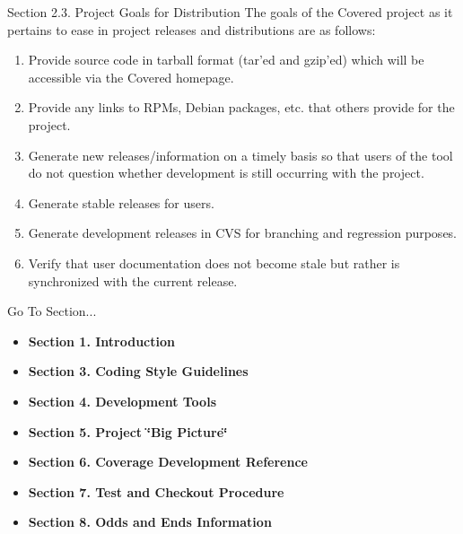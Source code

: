 \begin{Desc}
\item[Section 2.3. Project Goals for Distribution]The goals of the Covered project as it pertains to ease in project releases and distributions are as follows:\end{Desc}
\begin{Desc}
\item[]\begin{enumerate}
\item Provide source code in tarball format (tar'ed and gzip'ed) which will be accessible via the Covered homepage.\item Provide any links to RPMs, Debian packages, etc. that others provide for the project.\item Generate new releases/information on a timely basis so that users of the tool do not question whether development is still occurring with the project.\item Generate stable releases for users.\item Generate development releases in CVS for branching and regression purposes.\item Verify that user documentation does not become stale but rather is synchronized with the current release.\end{enumerate}
\end{Desc}




\begin{Desc}
\item[Go To Section...]\begin{itemize}
\item {\bf Section 1.  Introduction} \item {\bf Section 3.  Coding Style Guidelines} \item {\bf Section 4.  Development Tools} \item {\bf Section 5.  Project \char`\"{}Big Picture\char`\"{}} \item {\bf Section 6.  Coverage Development Reference} \item {\bf Section 7.  Test and Checkout Procedure} \item {\bf Section 8.  Odds and Ends Information} \end{itemize}
\end{Desc}
